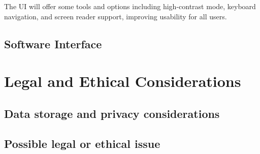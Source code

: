 \documentclass{article}
\begin{document}
The UI will offer some tools and options including high-contrast mode, keyboard navigation, and screen reader support, improving usability for all users.

\subsection{Software Interface}

\section{Legal and Ethical Considerations}
\subsection{Data storage and privacy considerations}

\subsection{Possible legal or ethical issue}

\printglossaries
\end{document}
